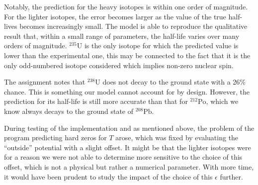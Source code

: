 \documentclass[a4paper,DIV=12,english]{scrartcl}
\begin{document}
Notably, the prediction for the heavy isotopes is within one order of magnitude. For the lighter isotopes, the error becomes larger as the value of the true half-lives becomes increasingly small. The model is able to reproduce the qualitative result that, within a small range of parameters, the half-life varies over many orders of magnitude. $^{235}\text{U}$ is the only isotope for which the predicted value is lower than the experimental one, this may be connected to the fact that it is the only odd-numbered isotope considered which implies non-zero nuclear spin.

The assignment notes that $^{238}\text{U}$ does not decay to the ground state with a 26\% chance. This is something our model cannot account for by design. However, the prediction for its half-life is still more accurate than that for $^{212}\text{Po}$, which we know always decays to the ground state of $^{208}\text{Pb}$. 

During testing of the implementation and as mentioned above, the problem of the program predicting hard zeros for $T$ arose, which was fixed by evaluating the \enquote{outside} potential with a slight offset. It might be that the lighter isotopes were for a reason we were not able to determine more sensitive to the choice of this offset, which is not a physical but rather a numerical parameter. With more time, it would have been prudent to study the impact of the choice of this $\epsilon$ further.
\end{document}
